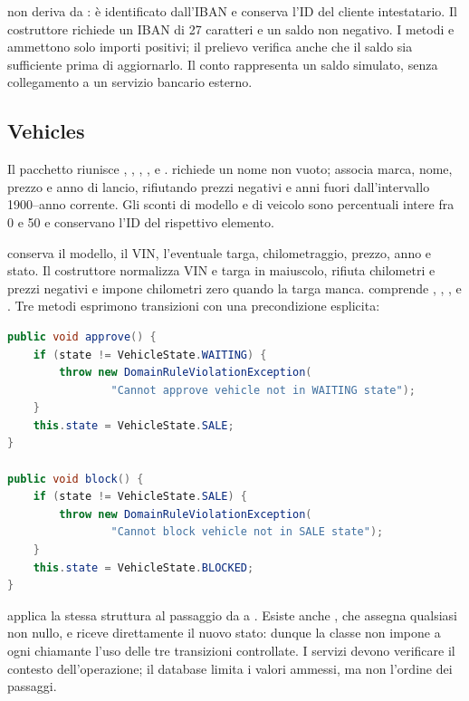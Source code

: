  non deriva da : è identificato dall'IBAN e conserva l'ID del cliente intestatario. Il costruttore richiede un IBAN di 27 caratteri e un saldo non negativo. I metodi  e  ammettono solo importi positivi; il prelievo verifica anche che il saldo sia sufficiente prima di aggiornarlo. Il conto rappresenta un saldo simulato, senza collegamento a un servizio bancario esterno.

\subsection{Vehicles}
Il pacchetto  riunisce , , , ,  e .  richiede un nome non vuoto;  associa marca, nome, prezzo e anno di lancio, rifiutando prezzi negativi e anni fuori dall'intervallo 1900--anno corrente. Gli sconti di modello e di veicolo sono percentuali intere fra 0 e 50 e conservano l'ID del rispettivo elemento.

 conserva il modello, il VIN, l'eventuale targa, chilometraggio, prezzo, anno e stato. Il costruttore normalizza VIN e targa in maiuscolo, rifiuta chilometri e prezzi negativi e impone chilometri zero quando la targa manca.  comprende , , ,  e . Tre metodi esprimono transizioni con una precondizione esplicita:
\begin{lstlisting}[language=Java,caption={Transizioni controllate dello stato di Vehicle.}]
public void approve() {
    if (state != VehicleState.WAITING) {
        throw new DomainRuleViolationException(
                "Cannot approve vehicle not in WAITING state");
    }
    this.state = VehicleState.SALE;
}

public void block() {
    if (state != VehicleState.SALE) {
        throw new DomainRuleViolationException(
                "Cannot block vehicle not in SALE state");
    }
    this.state = VehicleState.BLOCKED;
}
\end{lstlisting}
 applica la stessa struttura al passaggio da  a . Esiste anche , che assegna qualsiasi  non nullo, e  riceve direttamente il nuovo stato: dunque la classe non impone a ogni chiamante l'uso delle tre transizioni controllate. I servizi devono verificare il contesto dell'operazione; il database limita i valori ammessi, ma non l'ordine dei passaggi.

